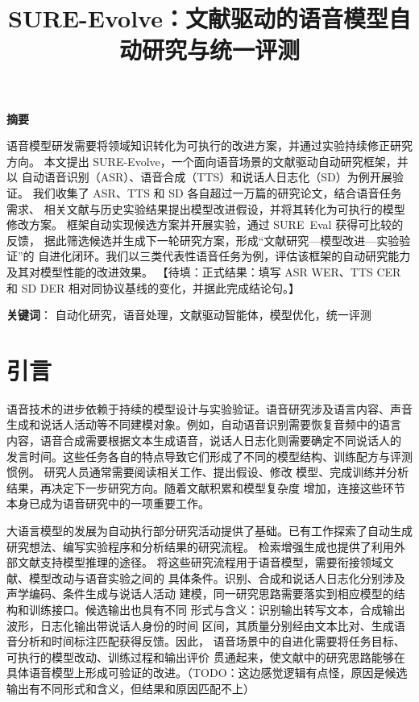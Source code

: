 \documentclass{article}
\title{SURE-Evolve：文献驱动的语音模型自动研究与统一评测}
\newcommand{\pending}[1]{\textcolor{blue!65!black}{【待填：#1】}}
\renewenvironment{abstract}{\begin{center}\bfseries 摘要\end{center}}{\par}
\renewenvironment{keywords}{\vspace{.5em}\noindent\textbf{关键词}：}{\par}
\begin{document}
\maketitle
\raggedbottom

\begin{abstract}
语音模型研发需要将领域知识转化为可执行的改进方案，并通过实验持续修正研究方向。
本文提出 SURE-Evolve，一个面向语音场景的文献驱动自动研究框架，并以
自动语音识别（ASR）、语音合成（TTS）和说话人日志化（SD）为例开展验证。
我们收集了 ASR、TTS 和 SD 各自超过一万篇的研究论文，结合语音任务需求、
相关文献与历史实验结果提出模型改进假设，并将其转化为可执行的模型修改方案。
框架自动实现候选方案并开展实验，通过 SURE~Eval 获得可比较的反馈，
据此筛选候选并生成下一轮研究方案，形成“文献研究—模型改进—实验验证”的
自进化闭环。我们以三类代表性语音任务为例，评估该框架的自动研究能力及其对模型性能的改进效果。
\pending{正式结果：填写 ASR WER、TTS CER 和 SD DER
相对同协议基线的变化，并据此完成结论句。}
\end{abstract}

\begin{keywords}
自动化研究，语音处理，文献驱动智能体，模型优化，统一评测
\end{keywords}

\section{引言}
\label{sec:intro}

语音技术的进步依赖于持续的模型设计与实验验证。语音研究涉及语言内容、声音
生成和说话人活动等不同建模对象。例如，自动语音识别需要恢复音频中的语言
内容，语音合成需要根据文本生成语音，说话人日志化则需要确定不同说话人的
发言时间。这些任务各自的特点导致它们形成了不同的模型结构、训练配方与评测惯例。
研究人员通常需要阅读相关工作、提出假设、修改
模型、完成训练并分析结果，再决定下一步研究方向。随着文献积累和模型复杂度
增加，连接这些环节本身已成为语音研究中的一项重要工作。

大语言模型的发展为自动执行部分研究活动提供了基础。已有工作探索了自动生成
研究想法、编写实验程序和分析结果的研究流程\cite{lu2024aiscientist}。
检索增强生成也提供了利用外部文献支持模型推理的途径\cite{lewis2020rag}。
将这些研究流程用于语音模型，需要衔接领域文献、模型改动与语音实验之间的
具体条件。识别、合成和说话人日志化分别涉及声学编码、条件生成与说话人活动
建模，同一研究思路需要落实到相应模型的结构和训练接口。候选输出也具有不同
形式与含义：识别输出转写文本，合成输出波形，日志化输出带说话人身份的时间
区间，其质量分别经由文本比对、生成语音分析和时间标注匹配获得反馈。因此，
语音场景中的自进化需要将任务目标、可执行的模型改动、训练过程和输出评价
贯通起来，使文献中的研究思路能够在具体语音模型上形成可验证的改进。（TODO：这边感觉逻辑有点怪，原因是候选输出有不同形式和含义，但结果和原因匹配不上）
\end{document}
